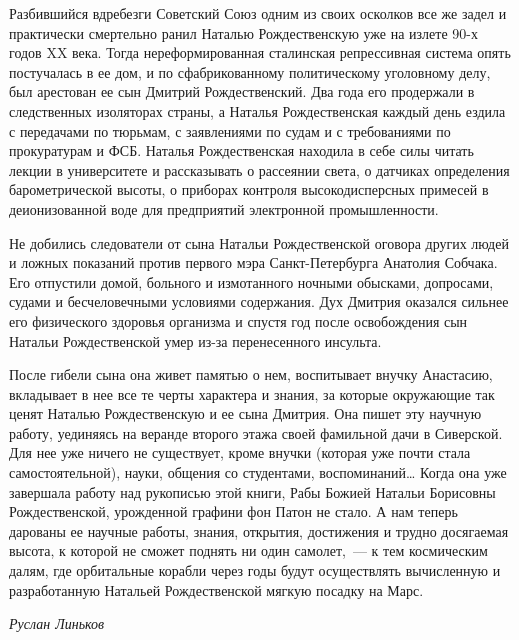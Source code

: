 Разбившийся вдребезги Советский Союз одним из своих осколков все же задел и практически смертельно ранил Наталью Рождественскую уже на излете 90-х годов XX века. Тогда нереформированная сталинская репрессивная система опять постучалась в ее дом, и по сфабрикованному политическому уголовному делу, был арестован ее сын Дмитрий Рождественский. Два года его продержали в следственных изоляторах страны, а Наталья Рождественская каждый день ездила с передачами по тюрьмам, с заявлениями по судам и с требованиями по прокуратурам и ФСБ. Наталья Рождественская находила в себе силы читать лекции в университете и рассказывать о рассеянии света, о датчиках определения барометрической высоты, о приборах контроля высокодисперсных примесей в деионизованной воде для предприятий электронной промышленности.

Не добились следователи от сына Натальи Рождественской оговора других людей и ложных показаний против первого мэра Санкт-Петербурга Анатолия Собчака. Его отпустили домой, больного и измотанного ночными обысками, допросами, судами и бесчеловечными условиями содержания. Дух Дмитрия оказался сильнее его физического здоровья организма и спустя год после освобождения сын Натальи Рождественской умер из-за перенесенного инсульта.

\thispagestyle{myheadings}

После гибели сына она живет памятью о нем, воспитывает внучку Анастасию, вкладывает в нее все те черты характера и знания, за которые окружающие так ценят Наталью Рождественскую и ее сына Дмитрия. Она пишет эту научную работу, уединяясь на веранде второго этажа своей фамильной дачи в Сиверской. Для нее уже ничего не существует, кроме внучки (которая уже почти стала самостоятельной), науки, общения со студентами, воспоминаний… Когда она уже завершала работу над рукописью этой книги, Рабы Божией Натальи Борисовны Рождественской, урожденной графини фон Патон не стало. А нам теперь дарованы ее научные работы, знания, открытия, достижения и трудно досягаемая высота, к которой не сможет поднять ни один самолет,~--- к тем космическим далям, где орбитальные корабли через годы будут осуществлять вычисленную и разработанную Натальей Рождественской мягкую посадку на Марс.


\vskip 4mm
\hfill{\it Руслан Линьков}

\pagestyle{myheadings}
